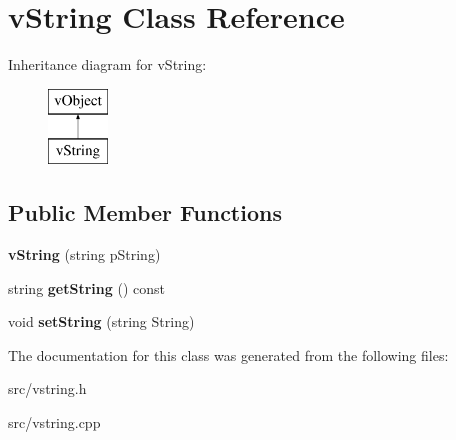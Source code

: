 \hypertarget{classv_string}{\section{v\-String Class Reference}
\label{classv_string}
}
Inheritance diagram for v\-String\-:\begin{figure}[H]
\begin{center}
\leavevmode
\includegraphics[height=2.000000cm]{classv_string}
\end{center}
\end{figure}
\subsection*{Public Member Functions}
\begin{DoxyCompactItemize}
\item 
\hypertarget{classv_string_a111ca49a5cd3ed01604e074b45b98fab}{{\bfseries v\-String} (string p\-String)}\label{classv_string_a111ca49a5cd3ed01604e074b45b98fab}

\item 
\hypertarget{classv_string_a84de4453161248d4eafb8ff1a28e48dc}{string {\bfseries get\-String} () const }\label{classv_string_a84de4453161248d4eafb8ff1a28e48dc}

\item 
\hypertarget{classv_string_a2b18dc391d5fccdba7563590c55c798d}{void {\bfseries set\-String} (string String)}\label{classv_string_a2b18dc391d5fccdba7563590c55c798d}

\end{DoxyCompactItemize}


The documentation for this class was generated from the following files\-:\begin{DoxyCompactItemize}
\item 
src/vstring.\-h\item 
src/vstring.\-cpp\end{DoxyCompactItemize}
